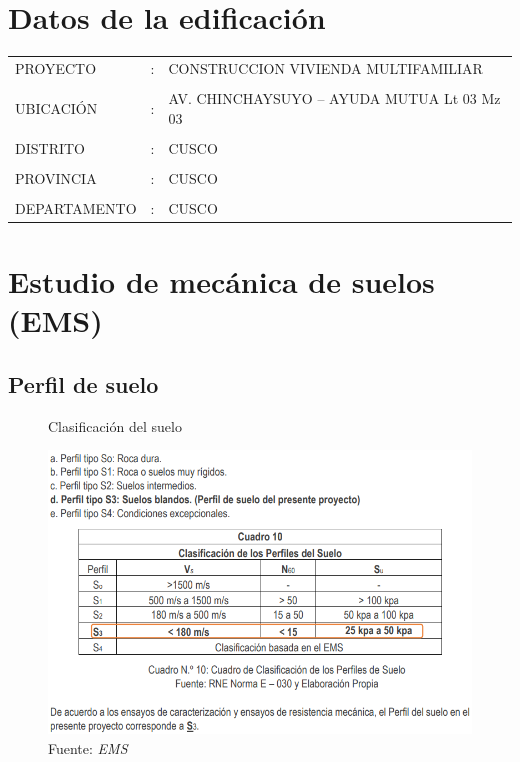 \section{Datos de la edificación}

\begin{table}[htbp]
  \centering
    \begin{tabular}{lrl}
    PROYECTO  & :     & CONSTRUCCION VIVIENDA MULTIFAMILIAR \\
          &       &  \\ 
    UBICACIÓN & :     & AV. CHINCHAYSUYO – AYUDA MUTUA Lt 03 Mz 03 \\
          &       &  \\
    DISTRITO & :     & CUSCO \\
          &       &  \\
    PROVINCIA & :     & CUSCO \\
          &       &  \\
    DEPARTAMENTO & :     & CUSCO \\
    \end{tabular}%
  \label{tab:addlabel}%
\end{table}%
\vspace{-0.8cm}

\section{Estudio de mecánica de suelos (EMS)}

\subsection{Perfil de suelo}

\begin{figure}[h!]
    \centering
    \caption{Clasificación del suelo}
    \includegraphics[scale=0.85]{IMAGENES/1.PNG}
    \caption*{\small Fuente: \it EMS}
    \label{fig:my_label}
\end{figure}

